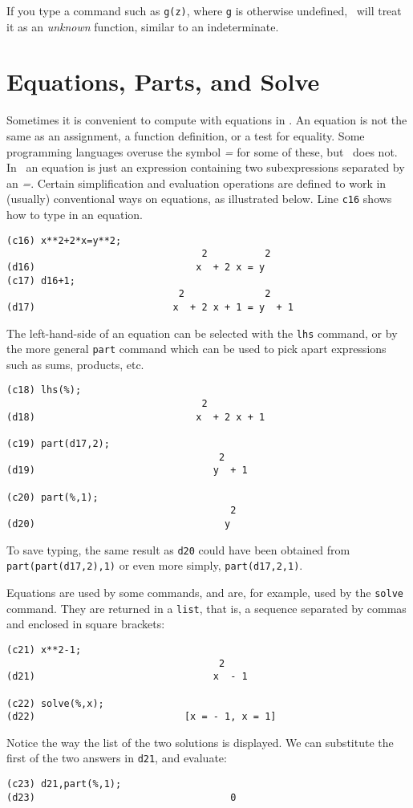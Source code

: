 If you type a command such as {\tt g(z)}, where {\tt g}  is otherwise
undefined, \Max\ will treat it as an {\it unknown} function, similar to 
an indeterminate.

\section{Equations, Parts, and Solve}

Sometimes it is convenient to compute with equations in
\Max.
An equation is not the same as an assignment, a function definition, or
a test for equality.  Some programming languages overuse the symbol
{\it =} for some of these, but
\Max\
does not.
In
\Max\, 
an equation is just an expression containing two subexpressions separated
by an {\it =}.
Certain simplification and evaluation operations are defined
to work in (usually) conventional ways on equations,
as illustrated below.  Line {\tt c16}
shows how to type in an equation.
\begin{verbatim}
(c16) x**2+2*x=y**2;
                                  2          2
(d16)                            x  + 2 x = y
(c17) d16+1;
                              2              2
(d17)                        x  + 2 x + 1 = y  + 1
\end{verbatim}
The left-hand-side of an equation can be selected with the {\tt lhs}
command,
or by the more general {\tt part}
command which can be used to pick apart
expressions such as sums, products, etc.
\begin{verbatim}
(c18) lhs(%);
                                  2
(d18)                            x  + 2 x + 1

(c19) part(d17,2);
                                     2
(d19)                               y  + 1

(c20) part(%,1);
                                       2
(d20)                                 y

\end{verbatim}
To save typing, the same result as {\tt d20}
could have been obtained from 
{\tt part(part(d17,2),1)}
or even more simply, {\tt part(d17,2,1)}.

Equations are used by some commands, and are, for example,
used by the {\tt solve}
command. They are returned in a {\tt list}, that
is, a sequence separated by commas and enclosed in square brackets:
\begin{verbatim}
(c21) x**2-1;
                                     2
(d21)                               x  - 1

(c22) solve(%,x);
(d22)                          [x = - 1, x = 1]
\end{verbatim}
Notice the way the list of the two solutions is displayed.  We can substitute
the first of the two answers in {\tt d21}, and evaluate:
\begin{verbatim}
(c23) d21,part(%,1);
(d23)                                  0
\end{verbatim}

